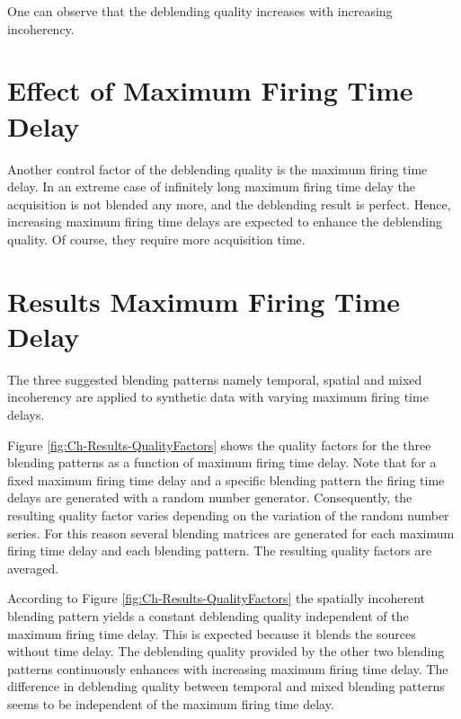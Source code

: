 One can observe that the deblending quality increases with increasing incoherency.


\section{Effect of Maximum Firing Time Delay}

Another control factor of the deblending quality is the maximum firing time delay. In an extreme case of infinitely long maximum firing time delay the acquisition is not blended any more, and the deblending result is perfect. Hence, increasing maximum firing time delays are expected to enhance the deblending quality. Of course, they require more acquisition time.



\section{Results Maximum Firing Time Delay}

The three suggested blending patterns namely temporal, spatial and mixed incoherency are applied to synthetic data with varying maximum firing time delays. 

Figure \ref{fig:Ch-Results-QualityFactors} shows the quality factors for the three blending patterns as a function of maximum firing time delay. Note that for a fixed maximum firing time delay and a specific blending pattern the firing time delays are generated with a random number generator. Consequently, the resulting quality factor varies depending on the variation of the random number series. For this reason several blending matrices are generated for each maximum firing time delay and each blending pattern. The resulting quality factors are averaged.

According to Figure \ref{fig:Ch-Results-QualityFactors} the spatially incoherent blending pattern yields a constant deblending quality independent of the maximum firing time delay. This is expected because it blends the sources without time delay. The deblending quality provided by the other two blending patterns continuously enhances with increasing maximum firing time delay. The difference in deblending quality between temporal and mixed blending patterns seems to be independent of the maximum firing time delay.

